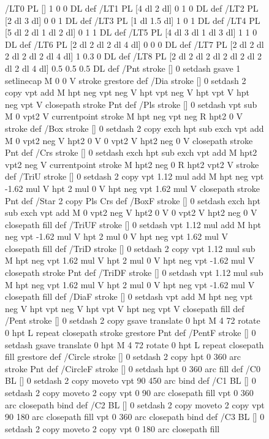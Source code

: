 \documentclass{LMCS}
\begin{document}
\begin{figure}[!tbp]
\begin{minipage}[b]{.45\linewidth}
{{{/LT0 { PL [] 1 0 0 DL } def
/LT1 { PL [4 dl 2 dl] 0 1 0 DL } def
/LT2 { PL [2 dl 3 dl] 0 0 1 DL } def
/LT3 { PL [1 dl 1.5 dl] 1 0 1 DL } def
/LT4 { PL [5 dl 2 dl 1 dl 2 dl] 0 1 1 DL } def
/LT5 { PL [4 dl 3 dl 1 dl 3 dl] 1 1 0 DL } def
/LT6 { PL [2 dl 2 dl 2 dl 4 dl] 0 0 0 DL } def
/LT7 { PL [2 dl 2 dl 2 dl 2 dl 2 dl 4 dl] 1 0.3 0 DL } def
/LT8 { PL [2 dl 2 dl 2 dl 2 dl 2 dl 2 dl 2 dl 4 dl] 0.5 0.5 0.5 DL } def
/Pnt { stroke [] 0 setdash
   gsave 1 setlinecap M 0 0 V stroke grestore } def
/Dia { stroke [] 0 setdash 2 copy vpt add M
  hpt neg vpt neg V hpt vpt neg V
  hpt vpt V hpt neg vpt V closepath stroke
  Pnt } def
/Pls { stroke [] 0 setdash vpt sub M 0 vpt2 V
  currentpoint stroke M
  hpt neg vpt neg R hpt2 0 V stroke
  } def
/Box { stroke [] 0 setdash 2 copy exch hpt sub exch vpt add M
  0 vpt2 neg V hpt2 0 V 0 vpt2 V
  hpt2 neg 0 V closepath stroke
  Pnt } def
/Crs { stroke [] 0 setdash exch hpt sub exch vpt add M
  hpt2 vpt2 neg V currentpoint stroke M
  hpt2 neg 0 R hpt2 vpt2 V stroke } def
/TriU { stroke [] 0 setdash 2 copy vpt 1.12 mul add M
  hpt neg vpt -1.62 mul V
  hpt 2 mul 0 V
  hpt neg vpt 1.62 mul V closepath stroke
  Pnt  } def
/Star { 2 copy Pls Crs } def
/BoxF { stroke [] 0 setdash exch hpt sub exch vpt add M
  0 vpt2 neg V  hpt2 0 V  0 vpt2 V
  hpt2 neg 0 V  closepath fill } def
/TriUF { stroke [] 0 setdash vpt 1.12 mul add M
  hpt neg vpt -1.62 mul V
  hpt 2 mul 0 V
  hpt neg vpt 1.62 mul V closepath fill } def
/TriD { stroke [] 0 setdash 2 copy vpt 1.12 mul sub M
  hpt neg vpt 1.62 mul V
  hpt 2 mul 0 V
  hpt neg vpt -1.62 mul V closepath stroke
  Pnt  } def
/TriDF { stroke [] 0 setdash vpt 1.12 mul sub M
  hpt neg vpt 1.62 mul V
  hpt 2 mul 0 V
  hpt neg vpt -1.62 mul V closepath fill} def
/DiaF { stroke [] 0 setdash vpt add M
  hpt neg vpt neg V hpt vpt neg V
  hpt vpt V hpt neg vpt V closepath fill } def
/Pent { stroke [] 0 setdash 2 copy gsave
  translate 0 hpt M 4 {72 rotate 0 hpt L} repeat
  closepath stroke grestore Pnt } def
/PentF { stroke [] 0 setdash gsave
  translate 0 hpt M 4 {72 rotate 0 hpt L} repeat
  closepath fill grestore } def
/Circle { stroke [] 0 setdash 2 copy
  hpt 0 360 arc stroke Pnt } def
/CircleF { stroke [] 0 setdash hpt 0 360 arc fill } def
/C0 { BL [] 0 setdash 2 copy moveto vpt 90 450  arc } bind def
/C1 { BL [] 0 setdash 2 copy        moveto
       2 copy  vpt 0 90 arc closepath fill
               vpt 0 360 arc closepath } bind def
/C2 { BL [] 0 setdash 2 copy moveto
       2 copy  vpt 90 180 arc closepath fill
               vpt 0 360 arc closepath } bind def
/C3 { BL [] 0 setdash 2 copy moveto
       2 copy  vpt 0 180 arc closepath fill
}}}}
\end{minipage}
\end{figure}
\end{document}
